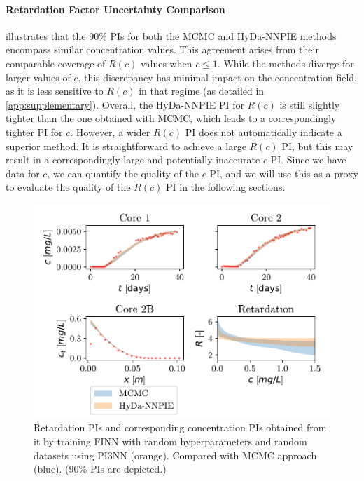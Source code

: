 \paragraph{Retardation Factor Uncertainty Comparison}
 illustrates that the 90\% PIs for both the MCMC and HyDa-NNPIE methods encompass similar concentration values. This agreement arises from their comparable coverage of $R(c)$ values when $c \leq 1$. While the methods diverge for larger values of $c$, this discrepancy has minimal impact on the concentration field, as it is less sensitive to $R(c)$ in that regime (as detailed in \cref{app:supplementary}).
Overall, the HyDa-NNPIE PI for $R(c)$ is still slightly tighter than the one obtained with MCMC, which leads to a correspondingly tighter PI for $c$. However, a wider $R(c)$ PI does not automatically indicate a superior method. It is straightforward to achieve a large $R(c)$ PI, but this may result in a correspondingly large and potentially inaccurate $c$ PI. Since we have data for $c$, we can quantify the quality of the $c$ PI, and we will use this as a proxy to evaluate the quality of the $R(c)$ PI in the following sections.

\begin{figure}[h!]
    \centering
    \includegraphics{figs/finn_MCMCvsFull-SPAN_PIs.pdf}
    \caption{Retardation PIs and corresponding concentration PIs obtained from it by training FINN with random hyperparameters and random datasets using PI3NN (orange). Compared with MCMC approach (blue). (90\% PIs are depicted.)}
    \label{fig:mcmc_vs_fullspan}
\end{figure}



